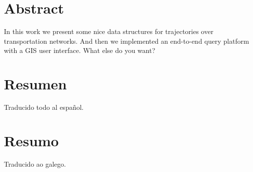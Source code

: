 
\chapter*{Abstract}

In this work we present some nice data structures for trajectories over transportation networks. And then we implemented an end-to-end query platform with a GIS user interface. What else do you want?

\chapter*{Resumen}

Traducido todo al espa\~nol.

\chapter*{Resumo}

Traducido ao galego.
 

